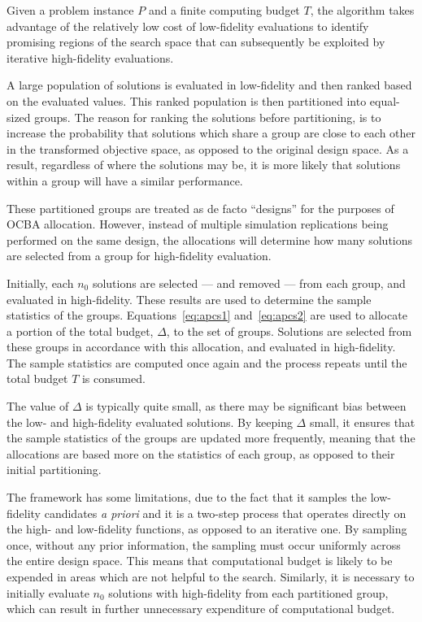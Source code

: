 Given a problem instance $P$ and a finite computing budget $T$, the \motos{} algorithm takes advantage of the relatively low cost of low-fidelity evaluations to identify promising regions of the search space that can subsequently be exploited by iterative high-fidelity evaluations.

A large population of solutions is evaluated in low-fidelity and then ranked based on the evaluated values. This ranked population is then partitioned into equal-sized groups. The reason for ranking the solutions before partitioning, is to increase the probability that solutions which share a group are close to each other in the transformed objective space, as opposed to the original design space. As a result, regardless of where the solutions may be, it is more likely that solutions within a group will have a similar performance.

These partitioned groups are treated as de facto ``designs'' for the purposes of OCBA allocation. However, instead of multiple simulation replications being performed on the same design, the allocations will determine how many solutions are selected from a group for high-fidelity evaluation.

Initially, each $n_0$ solutions are selected --- and removed --- from each group, and evaluated in high-fidelity. These results are used to determine the sample statistics of the groups. Equations~\ref{eq:apcs1} and~\ref{eq:apcs2} are used to allocate a portion of the total budget, $\Delta$, to the set of groups. Solutions are selected from these groups in accordance with this allocation, and evaluated in high-fidelity. The sample statistics are computed once again and the process repeats until the total budget $T$ is consumed. 

The value of $\Delta$ is typically quite small, as there may be significant bias between the low- and high-fidelity evaluated solutions. By keeping $\Delta$ small, it ensures that the sample statistics of the groups are updated more frequently, meaning that the allocations are based more on the statistics of each group, as opposed to their initial partitioning.

The \motos{} framework has some limitations, due to the fact that it samples the low-fidelity candidates \emph{a priori} and it is a two-step process that operates directly on the high- and low-fidelity functions, as opposed to an iterative one. By sampling once, without any prior information, the sampling must occur uniformly across the entire design space. This means that computational budget is likely to be expended in areas which are not helpful to the search. Similarly, it is necessary to initially evaluate $n_0$ solutions with high-fidelity from each partitioned group, which can result in further unnecessary expenditure of computational budget.

